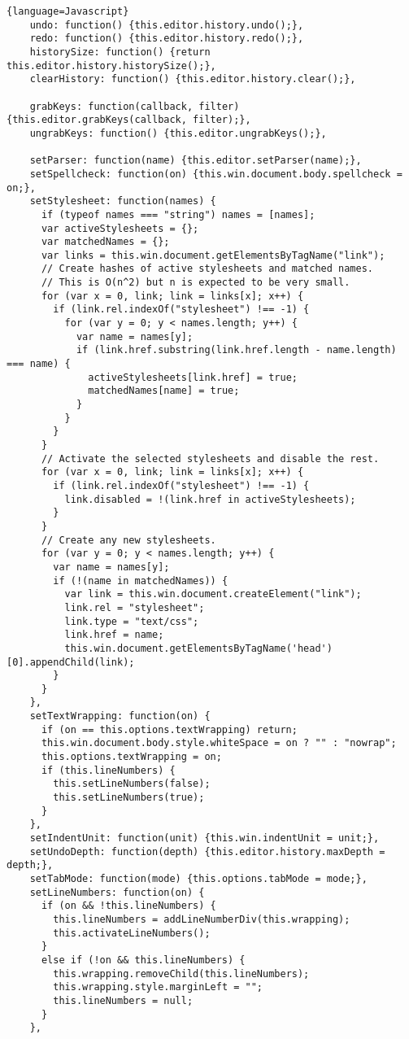 \begin{lstlisting}{language=Javascript}
    undo: function() {this.editor.history.undo();},
    redo: function() {this.editor.history.redo();},
    historySize: function() {return this.editor.history.historySize();},
    clearHistory: function() {this.editor.history.clear();},

    grabKeys: function(callback, filter) {this.editor.grabKeys(callback, filter);},
    ungrabKeys: function() {this.editor.ungrabKeys();},

    setParser: function(name) {this.editor.setParser(name);},
    setSpellcheck: function(on) {this.win.document.body.spellcheck = on;},
    setStylesheet: function(names) {
      if (typeof names === "string") names = [names];
      var activeStylesheets = {};
      var matchedNames = {};
      var links = this.win.document.getElementsByTagName("link");
      // Create hashes of active stylesheets and matched names.
      // This is O(n^2) but n is expected to be very small.
      for (var x = 0, link; link = links[x]; x++) {
        if (link.rel.indexOf("stylesheet") !== -1) {
          for (var y = 0; y < names.length; y++) {
            var name = names[y];
            if (link.href.substring(link.href.length - name.length) === name) {
              activeStylesheets[link.href] = true;
              matchedNames[name] = true;
            }
          }
        }
      }
      // Activate the selected stylesheets and disable the rest.
      for (var x = 0, link; link = links[x]; x++) {
        if (link.rel.indexOf("stylesheet") !== -1) {
          link.disabled = !(link.href in activeStylesheets);
        }
      }
      // Create any new stylesheets.
      for (var y = 0; y < names.length; y++) {
        var name = names[y];
        if (!(name in matchedNames)) {
          var link = this.win.document.createElement("link");
          link.rel = "stylesheet";
          link.type = "text/css";
          link.href = name;
          this.win.document.getElementsByTagName('head')[0].appendChild(link);
        }
      }
    },
    setTextWrapping: function(on) {
      if (on == this.options.textWrapping) return;
      this.win.document.body.style.whiteSpace = on ? "" : "nowrap";
      this.options.textWrapping = on;
      if (this.lineNumbers) {
        this.setLineNumbers(false);
        this.setLineNumbers(true);
      }
    },
    setIndentUnit: function(unit) {this.win.indentUnit = unit;},
    setUndoDepth: function(depth) {this.editor.history.maxDepth = depth;},
    setTabMode: function(mode) {this.options.tabMode = mode;},
    setLineNumbers: function(on) {
      if (on && !this.lineNumbers) {
        this.lineNumbers = addLineNumberDiv(this.wrapping);
        this.activateLineNumbers();
      }
      else if (!on && this.lineNumbers) {
        this.wrapping.removeChild(this.lineNumbers);
        this.wrapping.style.marginLeft = "";
        this.lineNumbers = null;
      }
    },


\end{lstlisting}
